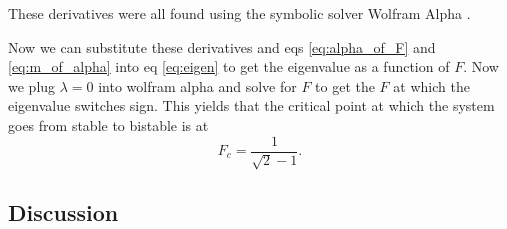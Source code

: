 \documentclass{article}
\begin{document}
These derivatives were all found using the symbolic solver Wolfram Alpha \cite{wolfram}. 

Now we can substitute these derivatives and eqs \eqref{eq:alpha_of_F} and \eqref{eq:m_of_alpha} into eq \eqref{eq:eigen} to get the eigenvalue as a function of $F$. Now we plug $\lambda = 0$ into wolfram alpha \cite{wolfram} and solve for $F$ to get the $F$ at which the eigenvalue switches sign. This yields that the critical point at which the system goes from stable to bistable is at
\begin{equation}
	F_c = \frac{1}{\sqrt{2} - 1}.
\end{equation}


\subsection{Discussion}
\end{document}
